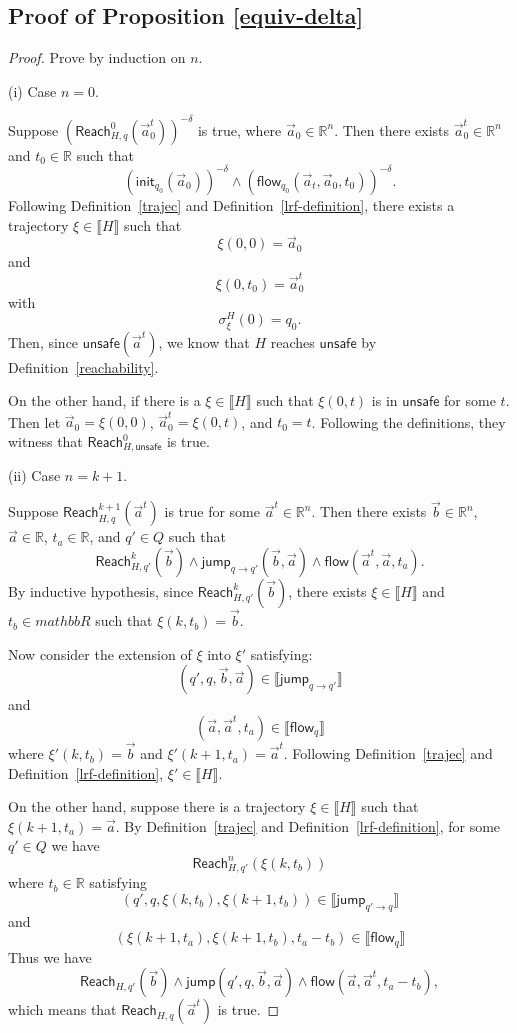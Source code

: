 \documentclass[envcountsect]{llncs}
\newcommand{\flow}{\mathsf{flow}}
\newcommand{\jump}{\mathsf{jump}}
\newcommand{\init}{\mathsf{init}}
\newcommand{\reach}{\mathsf{Reach}}
\newcommand{\unsafe}{\mathsf{unsafe}}
\begin{document}
\subsection*{Proof of Proposition \ref{equiv-delta}}
\begin{proof}
Prove by induction on $n$.

(i) Case $n=0$.

Suppose $(\reach^0_{H,q}(\vec a_0^t))^{-\delta}$ is true, where $\vec a_0\in \mathbb{R}^n$. Then there exists $\vec a_0^t\in \mathbb{R}^n$ and $t_0\in \mathbb{R}$ such that
$$(\init_{q_0}(\vec a_0))^{-\delta}\wedge(\flow_{q_0}(\vec a_t, \vec a_0, t_0))^{-\delta}.$$
Following Definition~\ref{trajec} and Definition~\ref{lrf-definition}, there exists a trajectory $\xi\in \llbracket H\rrbracket$ such that
$$\xi(0,0) = \vec a_0$$
and
$$\xi(0,t_0) = \vec a_0^t$$
with
$$\sigma^H_{\xi}(0) = q_0.$$
Then, since $\unsafe(\vec a^t)$, we know that $H$ reaches $\unsafe$ by Definition~\ref{reachability}.

On the other hand, if there is a $\xi\in \llbracket H\rrbracket$ such that $\xi(0,t)$ is in $\unsafe$ for some $t$. Then let $\vec a_0 = \xi(0,0)$, $\vec a_0^t = \xi(0,t)$, and $t_0 = t$. Following the definitions, they witness that $\reach^0_{H,\unsafe}$ is true.

(ii) Case $n=k+1$.

Suppose $\reach_{H,q}^{k+1}(\vec a^t)$ is true for some $\vec a^t\in\mathbb{R}^n$. Then there exists $\vec b\in \mathbb{R}^n$, $\vec a\in \mathbb{R}$, $t_a\in \mathbb{R}$, and $q'\in Q$ such that
$$\reach_{H,q'}^k(\vec b) \wedge \jump_{q\rightarrow q'}(\vec b, \vec a)\wedge \flow(\vec a^t, \vec a, t_a).$$
By inductive hypothesis, since $\reach_{H,q'}^k(\vec b)$, there exists $\xi\in\llbracket H\rrbracket$ and $t_b\in mathbb{R}$ such that $\xi(k, t_b) = \vec b$.


Now consider the extension of $\xi$ into $\xi'$ satisfying:
$$(q', q, \vec b, \vec a)\in \llbracket \jump_{q\rightarrow q'}\rrbracket$$
and
$$(\vec a, \vec a^t, t_a)\in \llbracket \flow_q \rrbracket$$
where $\xi'(k,t_b) = \vec b$ and $\xi'(k+1, t_a) = \vec a^t$. Following Definition~\ref{trajec} and Definition~\ref{lrf-definition}, $\xi'\in \llbracket H\rrbracket$.

On the other hand, suppose there is a trajectory $\xi\in\llbracket H\rrbracket$ such that $\xi(k+1, t_a) = \vec a$. By Definition~\ref{trajec} and Definition~\ref{lrf-definition}, for some $q'\in Q$ we have
$$\reach^n_{H,q'}(\xi(k,t_b))$$
where $t_b\in\mathbb{R}$ satisfying
$$(q', q, \xi(k,t_b), \xi(k+1,t_b))\in \llbracket \jump_{q'\rightarrow q} \rrbracket$$
and
$$(\xi(k+1,t_a), \xi(k+1,t_b), t_a - t_b)\in \llbracket \flow_q\rrbracket$$
Thus we have
$$\reach_{H,q'}(\vec b)\wedge \jump(q',q,\vec b, \vec a)\wedge \flow(\vec a, \vec a^t, t_a-t_b),$$
which means that $\reach_{H,q}(\vec a^t)$ is true.


\end{proof}
\end{document}
